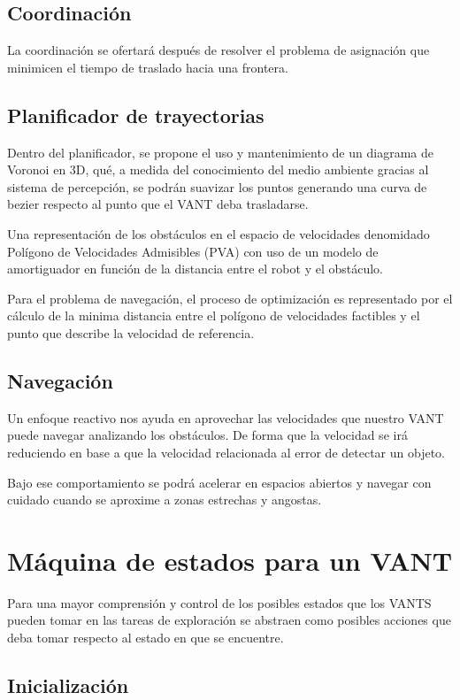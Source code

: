 \subsection*{Coordinación}
La coordinación se ofertará después de resolver el problema de asignación que minimicen el tiempo de traslado hacia una frontera.


\subsection*{Planificador de trayectorias}
Dentro del planificador, se propone el uso y mantenimiento de un diagrama de Voronoi en 3D, qué, a medida del conocimiento del medio ambiente gracias al sistema de percepción, se podrán suavizar los puntos generando una curva de bezier respecto al punto que el VANT deba trasladarse.

Una representación de los obstáculos en el espacio de velocidades denomidado Polígono de Velocidades Admisibles (PVA) \cite{ramirez2001} con uso de un modelo de amortiguador en función de la distancia entre el robot y el obstáculo.

Para el problema de navegación, el proceso de optimización es representado por el cálculo de la minima distancia entre el polígono de velocidades factibles y el punto que describe la velocidad de referencia.

\subsection*{Navegación}
Un enfoque reactivo nos ayuda en aprovechar las velocidades que nuestro VANT puede navegar analizando los obstáculos. De forma que la velocidad se irá reduciendo en base a que la velocidad relacionada al error de detectar un objeto.

Bajo ese comportamiento se podrá acelerar en espacios abiertos y navegar con cuidado cuando se aproxime a zonas estrechas y angostas.

\section{Máquina de estados para un VANT}

Para una mayor comprensión y control de los posibles estados que los VANTS pueden tomar
en las tareas de exploración se abstraen como posibles acciones que deba tomar respecto
al estado en que se encuentre.

\subsection*{Inicialización}

